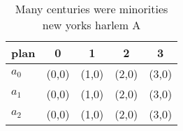 \documentclass[a4paper]{article}
\begin{document}
\begin{table}
\begin{adjustbox}{width=0.6\columnwidth}
\begin{tabular}{|l|l|l|l|l|}
\hline
\textbf{plan} & \multicolumn{1}{c|}{\textbf{0}} & \multicolumn{1}{c|}{\textbf{1}} & \multicolumn{1}{c|}{\textbf{2}} & \multicolumn{1}{c|}{\textbf{3}} \\ \hline
\textbf{$a_0$}  & (0,0) & (1,0) & (2,0) & (3,0) \\ \hline
\textbf{$a_1$}  & (0,0) & (1,0) & (2,0) & (3,0) \\ \hline
\textbf{$a_2$}  & (0,0) & (1,0) & (2,0) & (3,0) \\ \hline
\end{tabular}
\end{adjustbox}
\caption{Many centuries were minorities new yorks harlem A
}
\end{table}
\end{document}
